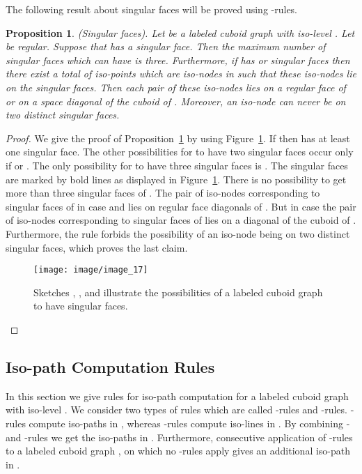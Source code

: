 \documentclass[a4paper,11pt]{article}
\newtheorem{proposition}[theorem]{Proposition}
\begin{document}
The following result about singular faces will be proved using -rules.
\begin{proposition}(Singular faces). Let  be a labeled cuboid graph with iso-level
. Let  be regular. Suppose that  has a singular face. Then the maximum number of
singular faces which  can have is three. Furthermore, if  has  or  singular faces then
there exist a total of  iso-points which are iso-nodes in  such that these iso-nodes lie on the
singular faces. Then each pair of these iso-nodes lies on a regular face of  or on a space diagonal
of the cuboid of . Moreover, an iso-node can never be on two distinct singular faces.
\label{prop:iso-path-1}
\end{proposition}
\begin{proof}
We give the proof of Proposition~\ref{prop:iso-path-1} by using Figure~\ref{image_17}.
If  then  has at least one singular face. The other possibilities
for  to have two singular faces occur only if  or .
The only possibility for  to have three singular faces is .
The singular faces are marked by bold lines as displayed in Figure~\ref{image_17}. There is no possibility
to get more than three singular faces of . The pair of iso-nodes corresponding to singular faces
of  in case  and  lies on regular face diagonals of . But in case  the pair of
iso-nodes corresponding to singular faces of  lies on a diagonal of the cuboid of . Furthermore,
the rule  forbids the possibility of an iso-node being on two distinct singular faces, which
proves the last claim.
\begin{figure}[!ht]
\texttt{[image: image/image\_17]}
\caption{Sketches , ,  and  illustrate the possibilities of a labeled
cuboid graph to have singular faces.}
\label{image_17}
\end{figure}
\end{proof}
\FloatBarrier

\subsection{Iso-path Computation Rules}
In this section we give rules for iso-path computation for a labeled cuboid graph  with
iso-level . We consider two types of rules which are called -rules and -rules.
-rules compute iso-paths in , whereas -rules compute iso-lines in . By combining - and
-rules we get the iso-paths in . Furthermore, consecutive application of -rules to a labeled
cuboid graph , on which no -rules apply gives an additional iso-path in .
\end{document}
